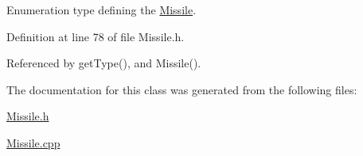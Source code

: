 Enumeration type defining the \hyperlink{classMissile}{Missile}. 



Definition at line 78 of file Missile.\-h.



Referenced by get\-Type(), and Missile().



The documentation for this class was generated from the following files\-:\begin{DoxyCompactItemize}
\item 
\hyperlink{Missile_8h}{Missile.\-h}\item 
\hyperlink{Missile_8cpp}{Missile.\-cpp}\end{DoxyCompactItemize}
